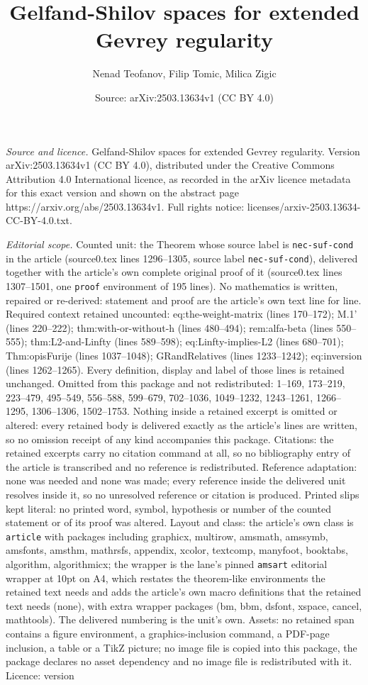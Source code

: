 \documentclass[10pt,a4paper]{amsart}
\title[Gelfand-Shilov spaces for extended Gevrey regularity]{Gelfand-Shilov spaces for extended Gevrey regularity}
\author{Nenad Teofanov, Filip Tomic, Milica Zigic}
\date{Source: arXiv:2503.13634v1 (CC BY 4.0)}
\begin{document}
\maketitle

\noindent\emph{Source and licence.} Gelfand-Shilov spaces for extended Gevrey regularity. Version arXiv:2503.13634v1 (CC BY 4.0), distributed under the Creative Commons Attribution 4.0 International licence, as recorded in the arXiv licence metadata for this exact version and shown on the abstract page https://arxiv.org/abs/2503.13634v1. Full rights notice: licenses/arxiv-2503.13634-CC-BY-4.0.txt.\par\smallskip

\noindent\textit{Editorial scope.} Counted unit: the Theorem whose source label is \texttt{nec-suf-cond} in the article (source0.tex lines 1296--1305, source label \texttt{nec-suf-cond}), delivered together with the article's own complete original proof of it (source0.tex lines 1307--1501, one \texttt{proof} environment of 195 lines). No mathematics is written, repaired or re-derived: statement and proof are the article's own text line for line. Required context retained uncounted: eq:the-weight-matrix (lines 170--172); M.1' (lines 220--222); thm:with-or-without-h (lines 480--494); rem:alfa-beta (lines 550--555); thm:L2-and-Linfty (lines 589--598); eq:Linfty-implies-L2 (lines 680--701); Thm:opisFurije (lines 1037--1048); GRandRelatives (lines 1233--1242); eq:inversion (lines 1262--1265). Every definition, display and label of those lines is retained unchanged. Omitted from this package and not redistributed: 1--169, 173--219, 223--479, 495--549, 556--588, 599--679, 702--1036, 1049--1232, 1243--1261, 1266--1295, 1306--1306, 1502--1753. Nothing inside a retained excerpt is omitted or altered: every retained body is delivered exactly as the article's lines are written, so no omission receipt of any kind accompanies this package. Citations: the retained excerpts carry no citation command at all, so no bibliography entry of the article is transcribed and no reference is redistributed. Reference adaptation: none was needed and none was made; every reference inside the delivered unit resolves inside it, so no unresolved reference or citation is produced. Printed slips kept literal: no printed word, symbol, hypothesis or number of the counted statement or of its proof was altered. Layout and class: the article's own class is \texttt{article} with packages including graphicx, multirow, amsmath, amssymb, amsfonts, amsthm, mathrsfs, appendix, xcolor, textcomp, manyfoot, booktabs, algorithm, algorithmicx; the wrapper is the lane's pinned \texttt{amsart} editorial wrapper at 10pt on A4, which restates the theorem-like environments the retained text needs and adds the article's own macro definitions that the retained text needs (none), with extra wrapper packages (bm, bbm, dsfont, xspace, cancel, mathtools). The delivered numbering is the unit's own. Assets: no retained span contains a figure environment, a graphics-inclusion command, a PDF-page inclusion, a table or a TikZ picture; no image file is copied into this package, the package declares no asset dependency and no image file is redistributed with it. Licence: version 
\end{document}
